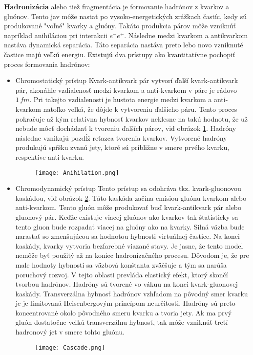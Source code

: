 \documentclass[../../main.tex]{subfiles}
\begin{document}
\textbf{Hadronizácia} alebo tiež fragmentácia je formovanie hadrónov z kvarkov a gluónov. Tento jav môže nastať po vysoko-energetických zrážkach častíc, kedy sú produkované "voľné" kvarky a gluóny. Takáto produkcia párov môže vzniknúť napríklad anihiláciou pri interakcii $e^-e^+$. Následne medzi kvarkom a antikvarkom nastáva dynamická separácia. Táto separácia nastáva preto lebo novo vzniknuté častice majú veľkú energiu. Existujú dva prístupy ako kvantitatívne pochopiť proces formovania hadrónov: 
\begin{itemize}
	\item Chromostatický prístup \newline
	Kvark-antikvark pár vytvorí ďalší kvark-antikvark pár, akonáhle vzdialenosť medzi kvarkom a anti-kvarkom v páre je rádovo $1\,fm$. Pri takejto vzdialenosti je hustota energie medzi kvarkom a anti-kvarkom natoľko veľká, že dôjde k vytvoreniu ďalšieho páru. Tento proces pokračuje až kým relatívna hybnosť kvarkov neklesne na takú hodnotu, že už nebude môcť dochádzať k tvoreniu ďalších párov, vid obrázok \ref{sf1:fig:anihilation}. Hadróny následne vznikajú pozdĺž reťazca tvorenia kvarkov. Vytvorené hadróny produkujú spŕšku zvanú jety, ktoré sú približne v smere prvého kvarku, respektíve anti-kvarku.
	\begin{figure}[!h]
	\centering
	\texttt{[image: Anihilation.png]}
	\caption{}
	\label{sf1:fig:anihilation}
	\end{figure}
	\item Chromodynamický prístup \newline
	Tento prístup sa odohráva tkz. kvark-gluonovou kaskádou, viď obrázok \ref{sf1:fig:cascade}. Táto kaskáda začína emisiou gluónu kvarkom alebo anti-kvarkom. Tento gluón môže produkovať buď kvark-antikvark pár alebo gluonový pár. Keďže existuje viacej gluónov ako kvarkov tak štatisticky sa tento gluon bude rozpadať viacej na gluóny ako na kvarky. Silná väzba bude narastať so zmenšujúcou sa hodnotou hybnosti virtuálnej častice. Na konci kaskády, kvarky vytvoria bezfarebné viazané stavy. Je jasne, že tento model nemôže byť použitý až na koniec hadronizačného procesu. Dôvodom je, že pre male hodnoty hybnosti sa väzbová konštanta zväčšuje a tým sa narúša poruchový rozvoj. V tejto oblasti prevláda elastický efekt, ktorý skončí tvorbou hadrónov. Hadróny sú tvorené vo vákuu na konci kvark-gluonovej kaskády. Transverzálna hybnosť hadrónov vzhľadom na pôvodný smer kvarku je je limitovaná Heisenbergovým princípom neurčitosti. Hadróny sú preto koncentrované okolo pôvodného smeru kvarku a tvoria jety. Ak ma prvý gluón dostatočne veľkú transverzálnu hybnosť, tak môže vzniknúť tretí hadronový jet v smere tohto gluónu.
	\begin{figure}[!h]
	\centering
	\texttt{[image: Cascade.png]}
	\caption{}
	\label{sf1:fig:cascade}
	\end{figure}
\end{itemize}
\end{document}
